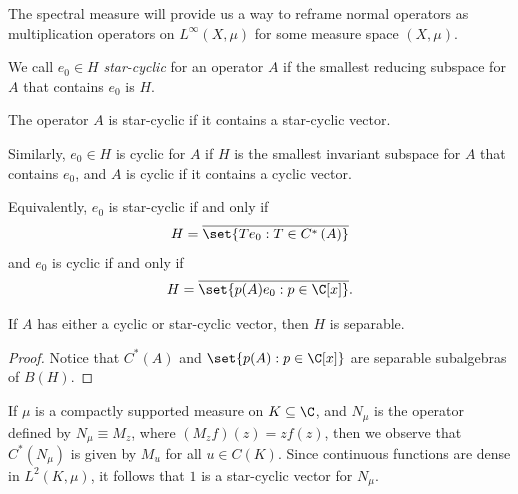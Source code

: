 \documentclass[10pt]{mypackage}
\begin{document}
The spectral measure will provide us a way to reframe normal operators as multiplication operators on $L^{\infty}\left( X,\mu \right)$ for some measure space $\left( X,\mu \right)$.
\begin{definition}
  We call $e_0\in H$ \textit{star-cyclic} for an operator $A$ if the smallest reducing subspace for $A$ that contains $e_0$ is $H$.

  The operator $A$ is star-cyclic if it contains a star-cyclic vector.

  Similarly, $e_0\in H$ is cyclic for $A$ if $H$ is the smallest invariant subspace for $A$ that contains $e_0$, and $A$ is cyclic if it contains a cyclic vector.
\end{definition}
Equivalently, $e_0$ is star-cyclic if and only if 
\begin{align*}
  H = \overline{\set{Te_0 : T\in C^{\ast}\left( A \right)}}
\end{align*}
 and $e_0$ is cyclic if and only if 
 \begin{align*}
   H = \overline{\set{p(A)e_0 : p\in \C[x]}}.
 \end{align*}
\begin{proposition}
  If $A$ has either a cyclic or star-cyclic vector, then $H$ is separable.
\end{proposition}
\begin{proof}
  Notice that $C^{\ast}\left( A \right)$ and $\set{p(A) : p\in \C[x]}$ are separable subalgebras of $B(H)$.
\end{proof}
If $\mu$ is a compactly supported measure on $K\subseteq \C$, and $N_{\mu}$ is the operator defined by $N_{\mu} \equiv M_z$, where $\left( M_zf \right)(z) = zf(z)$, then we observe that $C^{\ast}\left( N_{\mu} \right)$ is given by $M_{u}$ for all $u\in C(K)$. Since continuous functions are dense in $L^2\left( K, \mu \right)$, it follows that $1$ is a star-cyclic vector for $N_{\mu}$.
\end{document}

